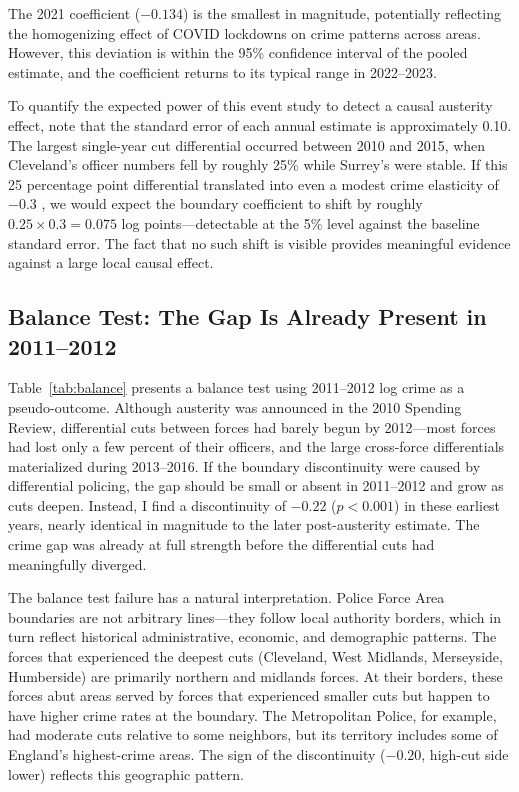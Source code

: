 \documentclass[12pt]{article}
\begin{document}
The 2021 coefficient ($-0.134$) is the smallest in magnitude, potentially reflecting the homogenizing effect of COVID lockdowns on crime patterns across areas. However, this deviation is within the 95\% confidence interval of the pooled estimate, and the coefficient returns to its typical range in 2022--2023.

To quantify the expected power of this event study to detect a causal austerity effect, note that the standard error of each annual estimate is approximately 0.10. The largest single-year cut differential occurred between 2010 and 2015, when Cleveland's officer numbers fell by roughly 25\% while Surrey's were stable. If this 25 percentage point differential translated into even a modest crime elasticity of $-0.3$ \citep{draca2011}, we would expect the boundary coefficient to shift by roughly $0.25 \times 0.3 = 0.075$ log points---detectable at the 5\% level against the baseline standard error. The fact that no such shift is visible provides meaningful evidence against a large local causal effect.

\subsection{Balance Test: The Gap Is Already Present in 2011--2012}

Table~\ref{tab:balance} presents a balance test using 2011--2012 log crime as a pseudo-outcome. Although austerity was announced in the 2010 Spending Review, differential cuts between forces had barely begun by 2012---most forces had lost only a few percent of their officers, and the large cross-force differentials materialized during 2013--2016. If the boundary discontinuity were caused by differential policing, the gap should be small or absent in 2011--2012 and grow as cuts deepen. Instead, I find a discontinuity of $-0.22$ ($p < 0.001$) in these earliest years, nearly identical in magnitude to the later post-austerity estimate. The crime gap was already at full strength before the differential cuts had meaningfully diverged.



The balance test failure has a natural interpretation. Police Force Area boundaries are not arbitrary lines---they follow local authority borders, which in turn reflect historical administrative, economic, and demographic patterns. The forces that experienced the deepest cuts (Cleveland, West Midlands, Merseyside, Humberside) are primarily northern and midlands forces. At their borders, these forces abut areas served by forces that experienced smaller cuts but happen to have higher crime rates at the boundary. The Metropolitan Police, for example, had moderate cuts relative to some neighbors, but its territory includes some of England's highest-crime areas. The sign of the discontinuity ($-0.20$, high-cut side lower) reflects this geographic pattern.
\end{document}
